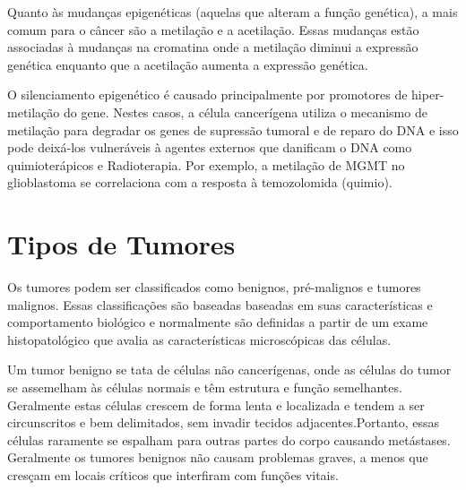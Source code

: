 \documentclass[11pt,a4paper]{article}
\newcounter{exemplo}
\begin{document}
    Quanto às mudanças epigenéticas (aquelas que alteram a função genética), a mais comum para o câncer são a metilação e a acetilação. Essas mudanças estão associadas à mudanças na cromatina onde a metilação diminui a expressão genética enquanto que a acetilação aumenta a expressão genética.
    
    O silenciamento epigenético é causado principalmente por promotores de hiper-metilação do gene. Nestes casos, a célula cancerígena utiliza o mecanismo de metilação para degradar os genes de supressão tumoral e de reparo do DNA e isso pode deixá-los vulneráveis à agentes externos que danificam o DNA como quimioterápicos e Radioterapia. Por exemplo, a metilação de MGMT no glioblastoma se correlaciona com a resposta à temozolomida (quimio).

\section{Tipos de Tumores}

    Os tumores podem ser classificados como benignos, pré-malignos e tumores malignos. Essas classificações são baseadas baseadas em suas características e comportamento biológico e normalmente são definidas a partir de um exame histopatológico que avalia as características microscópicas das células.

    Um \textcolor{CarnationPink}{tumor benigno} se tata de células não cancerígenas, onde as células do tumor se assemelham às células normais e têm estrutura e função semelhantes. Geralmente estas células crescem de forma lenta e localizada e tendem a ser circunscritos e bem delimitados, sem invadir tecidos adjacentes.Portanto, essas células raramente se espalham para outras partes do corpo causando metástases. Geralmente os tumores benignos não causam problemas graves, a menos que cresçam em locais críticos que interfiram com funções vitais.

    \begin{figure}
        \centering
    \end{figure}
\end{document}
